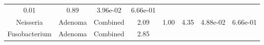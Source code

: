 \documentclass[12pt,]{article}
\begin{document}
\begin{longtable}[]{@{}cccccccc@{}}
\begin{minipage}[t]{0.14\columnwidth}
0.01\strut
\end{minipage} & \begin{minipage}[t]{0.14\columnwidth}\centering\strut
0.89\strut
\end{minipage} & \begin{minipage}[t]{0.06\columnwidth}\centering\strut
3.96e-02\strut
\end{minipage} & \begin{minipage}[t]{0.06\columnwidth}\centering\strut
6.66e-01\strut
\end{minipage}\tabularnewline
\begin{minipage}[t]{0.18\columnwidth}\centering\strut
Neisseria\strut
\end{minipage} & \begin{minipage}[t]{0.07\columnwidth}\centering\strut
Adenoma\strut
\end{minipage} & \begin{minipage}[t]{0.09\columnwidth}\centering\strut
Combined\strut
\end{minipage} & \begin{minipage}[t]{0.03\columnwidth}\centering\strut
2.09\strut
\end{minipage} & \begin{minipage}[t]{0.14\columnwidth}\centering\strut
1.00\strut
\end{minipage} & \begin{minipage}[t]{0.14\columnwidth}\centering\strut
4.35\strut
\end{minipage} & \begin{minipage}[t]{0.06\columnwidth}\centering\strut
4.88e-02\strut
\end{minipage} & \begin{minipage}[t]{0.06\columnwidth}\centering\strut
6.66e-01\strut
\end{minipage}\tabularnewline
\begin{minipage}[t]{0.18\columnwidth}\centering\strut
Fusobacterium\strut
\end{minipage} & \begin{minipage}[t]{0.07\columnwidth}\centering\strut
Adenoma\strut
\end{minipage} & \begin{minipage}[t]{0.09\columnwidth}\centering\strut
Combined\strut
\end{minipage} & \begin{minipage}[t]{0.03\columnwidth}\centering\strut
2.85\strut
\end{minipage} & \begin{minipage}[t]{0.14\columnwidth}\centering\strut

\end{minipage}
\end{longtable}
\end{document}

